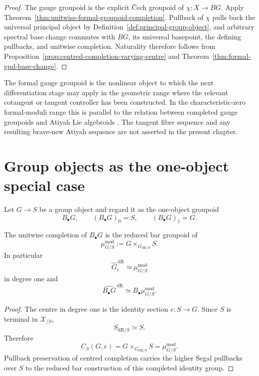 \begin{proof}
The gauge groupoid is the explicit \v{C}ech groupoid of
$\chi:X\to BG$.  Apply
Theorem~\ref{thm:unitwise-formal-groupoid-completion}.  Pullback of $\chi$
pulls back the universal principal object by
Definition~\ref{def:principal-group-object}, and arbitrary spectral base
change commutes with $BG$, its universal basepoint, the defining pullbacks,
and unitwise completion.  Naturality therefore follows from
Proposition~\ref{prop:centred-completion-varying-centre} and
Theorem~\ref{thm:formal-gpd-base-change}.
\end{proof}

\begin{remark}
\label{rem:gauge-preview-atiyah}
The formal gauge groupoid is the nonlinear object to which the next
differentiation stage may apply in the geometric range where the relevant
cotangent or tangent controller has been constructed.  In the
characteristic-zero formal-moduli range this is parallel to the relation
between completed gauge groupoids and Atiyah Lie algebroids
\cite{Nuiten2019}.  The tangent fibre sequence and any resulting brave-new
Atiyah sequence are not asserted in the present chapter.
\end{remark}


\section{Group objects as the one-object special case}
\label{sec:flg-one-object-groups}

Let $G\to S$ be a group object and regard it as the one-object groupoid
\[
    B_\bullet G,
    \qquad
    (B_\bullet G)_0=S,
    \qquad
    (B_\bullet G)_1=G.
\]

\begin{theorem}
\label{thm:one-object-completion}
The unitwise completion of $B_\bullet G$ is the reduced bar groupoid of
\[
    \mu^{\mathrm{mod}}_{G/S}
    :=
    G\times_{G_{\mathrm{dR}/S}}S.
\]
In particular
\[
    \widehat G^{\,\mathrm{dR}}_e
    \simeq
    \mu^{\mathrm{mod}}_{G/S}
\]
in degree one and
\[
    \widehat{B_\bullet G}^{\,\mathrm{dR}}
    \simeq
    B_\bullet\mu^{\mathrm{mod}}_{G/S}.
\]
\end{theorem}

\begin{proof}
The centre in degree one is the identity section
$e:S\to G$.  Since $S$ is terminal in $\mathcal X_{/S}$,
\[
    S_{\mathrm{dR}/S}\simeq S.
\]
Therefore
\[
    C_S(G,e)
    =
    G\times_{G_{\mathrm{dR}/S}}S
    =
    \mu^{\mathrm{mod}}_{G/S}.
\]
Pullback preservation of centred completion carries the higher Segal
pullbacks over $S$ to the reduced bar construction of this completed identity
group.
\end{proof}

